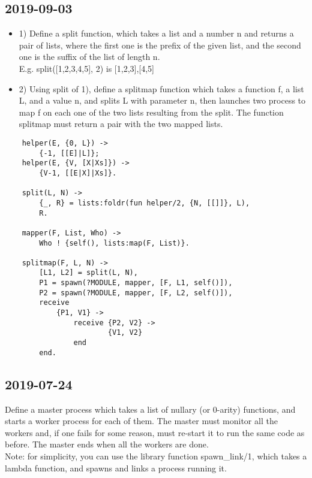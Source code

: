 \subsection{2019-09-03}
\begin{itemize}
    \item 1) Define a split function, which takes a list and a number n and returns a pair of lists, where the first one is  the prefix of the given list, and the second one is the suffix of the list of length n. \\ E.g. split([1,2,3,4,5], 2) is {[1,2,3],[4,5]}
    \item 2) Using split of 1), define a splitmap function which takes a function f, a list L, and a value n, and splits L with parameter n, then launches two process to map f on each one of the two lists resulting from the split. The function splitmap must return a pair with the two mapped lists.
\end{itemize}
\begin{lstlisting}
    helper(E, {0, L}) ->
        {-1, [[E]|L]};
    helper(E, {V, [X|Xs]}) ->
        {V-1, [[E|X]|Xs]}.

    split(L, N) ->
        {_, R} = lists:foldr(fun helper/2, {N, [[]]}, L),
        R.
        
    mapper(F, List, Who) ->
        Who ! {self(), lists:map(F, List)}.

    splitmap(F, L, N) ->
        [L1, L2] = split(L, N),
        P1 = spawn(?MODULE, mapper, [F, L1, self()]),
        P2 = spawn(?MODULE, mapper, [F, L2, self()]),
        receive
            {P1, V1} ->
                receive {P2, V2} ->
                        {V1, V2}
                end
        end.
\end{lstlisting}









\subsection{2019-07-24}
Define a master process which takes a list of nullary (or 0-arity) functions, and starts a worker process for
each of them. The master must monitor all the workers and, if one fails for some reason, must re-start it to
run the same code as before. The master ends when all the workers are done. \\
Note: for simplicity, you can use the library function spawn\_link/1, which takes a lambda function, and spawns and links a process running it. \\

